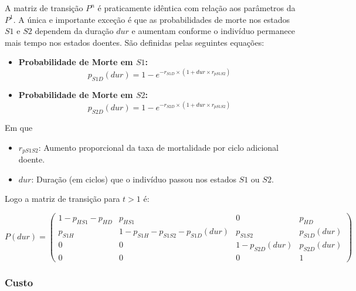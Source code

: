 \documentclass[12pt]{article}
\theoremstyle{break}
\begin{document}





A matriz de transição $P^{n}$ é praticamente idêntica com relação aos parâmetros da $P^{1}$. A única e importante exceção é que as probabilidades de morte nos estados \( S1 \) e \( S2 \) dependem da duração \( dur \) e aumentam conforme o indivíduo permanece mais tempo nos estados doentes. São definidas pelas seguintes equações:



\begin{itemize}
    \item \textbf{Probabilidade de Morte em \( S1 \):}
    \[
    p_{S1D}(dur) = 1 - e^{-r_{S1D} \times (1 + dur \times r_{pS1S2})}
    \]
    \item \textbf{Probabilidade de Morte em \( S2 \):}
    \[
    p_{S2D}(dur) = 1 - e^{-r_{S2D} \times (1 + dur \times r_{pS1S2})}
    \]
\end{itemize}

Em que
\begin{itemize}
    \item \( r_{pS1S2} \): Aumento proporcional da taxa de mortalidade por ciclo adicional doente.
    \item \( dur \): Duração (em ciclos) que o indivíduo passou nos estados \( S1 \) ou \( S2 \).
\end{itemize}


Logo a matriz de transição para $t>1$ é: 

\[
P(dur) =
\begin{pmatrix}
1 - p_{HS1} - p_{HD} & p_{HS1} & 0 & p_{HD} \\
p_{S1H} & 1 - p_{S1H} - p_{S1S2} - p_{S1D}(dur) & p_{S1S2} & p_{S1D}(dur) \\
0 & 0 & 1 - p_{S2D}(dur) & p_{S2D}(dur) \\
0 & 0 & 0 & 1
\end{pmatrix}
\]










\subsubsection{Custo}
\end{document}
